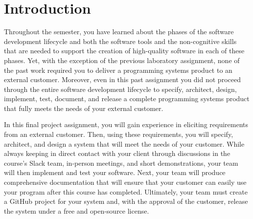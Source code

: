 

\usepackage[compact]{titlesec}

\usepackage[url=false,
    backend=biber,
    style=authoryear,
    doi=false,
    isbn=false,
    backref=false,
    dashed=false,                                   %
    maxnames=99,                                    %
    sorting=ydnt]{biblatex}                         %





\vspace*{-.1in}
\section*{Introduction}

\nocite{*}

Throughout the semester, you have learned about the phases of the software development lifecycle and both the software
tools and the non-cognitive skills that are needed to support the creation of high-quality software in each of these
phases. Yet, with the exception of the previous laboratory assignment, none of the past work required you to deliver a
programming systems product to an external customer. Moreover, even in this past assignment you did not proceed through
the entire software development lifecycle to specify, architect, design, implement, test, document, and release a
complete programming systems product that fully meets the needs of your external customer.

In this final project assignment, you will gain experience in eliciting requirements from an external customer. Then,
using these requirements, you will specify, architect, and design a system that will meet the needs of your customer.
While always keeping in direct contact with your client through discussions in the course's Slack team, in-person
meetings, and short demonstrations, your team will then implement and test your software. Next, your team will produce
comprehensive documentation that will ensure that your customer can easily use your program after this course has
completed.  Ultimately, your team must create a GitHub project for your system and, with the approval of the customer,
release the system under a free and open-source license.

